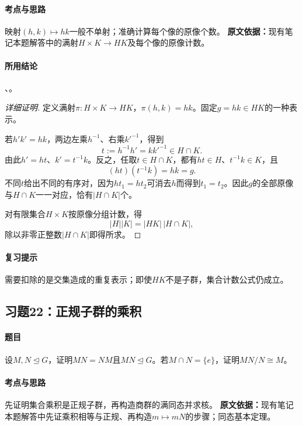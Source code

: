 \paragraph{考点与思路}
映射$(h,k)\mapsto hk$一般不单射；准确计算每个像的原像个数。
\textbf{原文依据：}现有笔记本题解答中的满射$H\times K\to HK$及每个像的原像计数。
\paragraph{所用结论}
、。
\begin{proof}[详细证明]
定义满射$\pi:H\times K\to HK$，$\pi(h,k)=hk$。固定$g=hk\in HK$的一种表示。

若$h'k'=hk$，两边左乘$h^{-1}$、右乘$k'^{-1}$，得到
\[
t:=h^{-1}h'=kk'^{-1}\in H\cap K.
\]
由此$h'=ht$、$k'=t^{-1}k$。反之，任取$t\in H\cap K$，都有$ht\in H$、$t^{-1}k\in K$，且
\[
(ht)(t^{-1}k)=hk=g.
\]
不同$t$给出不同的有序对，因为$ht_1=ht_2$可消去$h$而得到$t_1=t_2$。因此$g$的全部原像与$H\cap K$一一对应，恰有$|H\cap K|$个。

对有限集合$H\times K$按原像分组计数，得
\[
|H||K|=|HK|\,|H\cap K|,
\]
除以非零正整数$|H\cap K|$即得所求。
\end{proof}
\paragraph{复习提示}
需要扣除的是交集造成的重复表示；即使$HK$不是子群，集合计数公式仍成立。

\subsection{习题22：正规子群的乘积}
\paragraph{题目}
设$M,N\trianglelefteq G$，证明$MN=NM$且$MN\trianglelefteq G$。若$M\cap N=\{e\}$，证明$MN/N\cong M$。
\paragraph{考点与思路}
先证明集合乘积是正规子群，再构造商群的满同态并求核。
\textbf{原文依据：}现有笔记本题解答中先证乘积相等与正规、再构造$m\mapsto mN$的步骤；同态基本定理。
